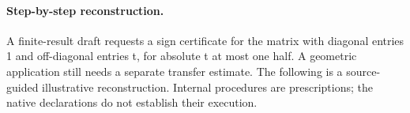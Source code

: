%
%
%
\paragraph{Step-by-step reconstruction.}
A finite-result draft requests a sign certificate for the matrix with diagonal entries 1 and off-diagonal entries t, for absolute t at most one half. A geometric application still needs a separate transfer estimate.
The following is a source-guided illustrative reconstruction. Internal procedures are prescriptions; the native declarations do not establish their execution.
